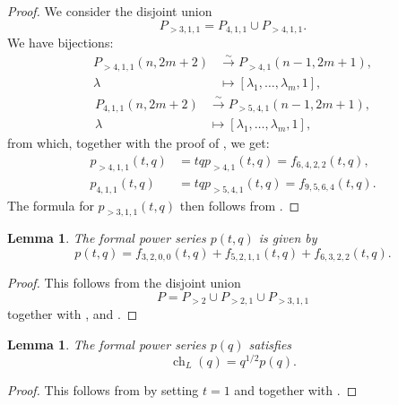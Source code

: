 \documentclass[a4paper, 12pt, reqno]{amsart}
\newtheorem{lemma}[theorem]{Lemma}
\theoremstyle{remark}
\DeclareMathOperator{\ch}{ch}
\begin{document}
\begin{proof}
  We consider the disjoint union
  \begin{equation*}
    P_{>3, 1, 1} = P_{4, 1, 1} \cup P_{>4, 1, 1}.
  \end{equation*}
  We have bijections:
  \begin{align*}
    P_{>4, 1, 1}(n, 2m + 2) &\xrightarrow{\sim} P_{>4, 1}(n - 1, 2m + 1), \\
    \lambda &\mapsto [\lambda_1, \dots, \lambda_m, 1],
  \end{align*}
  \begin{align*}
    P_{4, 1, 1}(n, 2m + 2) &\xrightarrow{\sim} P_{>5, 4, 1}(n - 1, 2m + 1), \\
    \lambda &\mapsto [\lambda_1, \dots, \lambda_m, 1],
  \end{align*}
  from which, together with the proof of , we get:
  \begin{align*}
    p_{>4, 1, 1}(t, q) &= tqp_{>4, 1}(t, q) = f_{6, 4, 2, 2}(t, q), \\
    p_{4, 1, 1}(t, q) &= tqp_{>5, 4, 1}(t, q) = f_{9, 5, 6, 4}(t, q).
  \end{align*}
  The formula for $p_{>3, 1, 1}(t, q)$ then follows from .
\end{proof}

\begin{lemma}
  \label{lmm:33}
  The formal power series $p(t, q)$ is given by
  \begin{equation*}
    p(t, q) = f_{3, 2, 0, 0}(t, q) + f_{5, 2, 1, 1}(t, q) + f_{6, 3, 2, 2}(t, q).
  \end{equation*}
\end{lemma}

\begin{proof}
  This follows from the disjoint union
  \begin{equation*}
    P = P_{>2} \cup P_{>2, 1} \cup P_{>3, 1, 1}
  \end{equation*}
  together with ,  and .
\end{proof}

\begin{lemma}
  \label{lmm:34}
  The formal power series $p(q)$ satisfies
  \begin{equation*}
    \ch_{L}(q) = q^{1/2}p(q).
  \end{equation*}
\end{lemma}

\begin{proof}
  This follows from  by setting $t = 1$ and \cite[Theorem 4]{andrews_singular_2022} together with .
\end{proof}
\end{document}
